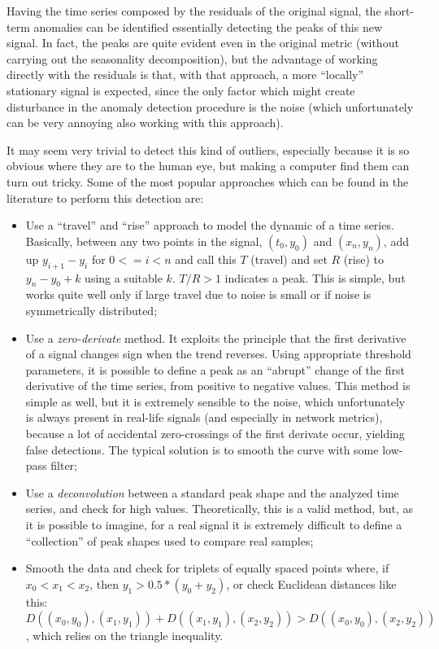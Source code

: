\documentclass[12pt,a4paper,cucitura]{toptesi}
\begin{document}
Having the time series composed by the residuals of the original signal, the short-term anomalies can be identified essentially detecting the peaks of this new signal.
In fact, the peaks are quite evident even in the original metric (without carrying out the seasonality decomposition), but the advantage of working directly with the residuals is that, with that approach, a more ``locally'' stationary signal is expected, since the only factor which might create disturbance in the anomaly detection procedure is the noise (which unfortunately can be very annoying also working with this approach).

It may seem very trivial to detect this kind of outliers, especially because it is so obvious where they are to the human eye, but making a computer find them can turn out tricky.
Some of the most popular approaches which can be found in the literature to perform this detection are:


\begin{itemize}
\item Use a ``travel'' and ``rise'' approach to model the dynamic of a time series. Basically, between any two points in the signal, $(t_0,y_0)$ and $(x_n,y_n)$, add up $y_{i+1}-y_i$ for $0 <= i < n$ and call this $T$ (travel) and set $R$ (rise) to $y_n- y_0 + k$ using a suitable $k$. $T/R > 1$ indicates a peak. This is simple, but works quite well only if large travel due to noise is small or if noise is symmetrically distributed;

\item Use a \emph{zero-derivate} method. It exploits the principle that the first derivative of a signal changes sign when the trend reverses. Using appropriate threshold parameters, it is possible to define a peak as an ``abrupt'' change of the first derivative of the time series, from positive to negative values. This method is simple as well, but it is extremely sensible to the noise, which unfortunately is always present in real-life signals (and especially in network metrics), because a lot of accidental zero-crossings of the first derivate occur, yielding false detections. The typical solution is to smooth the curve with some low-pass filter;

\item Use a \emph{deconvolution} between a standard peak shape and the analyzed time series, and check for high values. Theoretically, this is a valid method, but, as it is possible to imagine, for a real signal it is extremely difficult to define a ``collection'' of peak shapes used to compare real samples;

\item Smooth the data and check for triplets of equally spaced points where, if $x_0 < x_1 < x_2$, then $y_1 > 0.5*(y_0+y_2)$, or check Euclidean distances like this: $D((x_0,y_0),(x_1,y_1)) + D((x_1,y_1),(x_2,y_2)) > D((x_0,y_0),(x_2,y_2))$, which relies on the triangle inequality.

\end{itemize}
\end{document}
